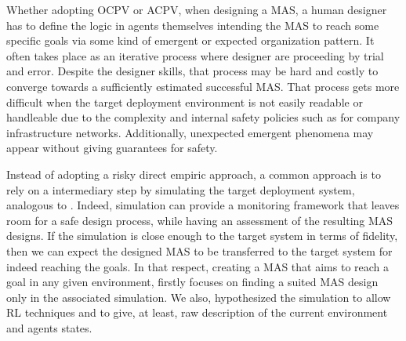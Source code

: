 \documentclass[runningheads]{llncs}
\begin{document}





Whether adopting OCPV or ACPV, when designing a MAS, a human designer has to define the logic in agents themselves intending the MAS to reach some specific goals via some kind of emergent or expected organization pattern. It often takes place as an iterative process where designer are proceeding by trial and error. Despite the designer skills, that process may be hard and costly to converge towards a sufficiently estimated successful MAS. That process gets more difficult when the target deployment environment is not easily readable or handleable due to the complexity and internal safety policies such as for company infrastructure networks. Additionally, unexpected emergent phenomena may appear without giving guarantees for safety.

Instead of adopting a risky direct empiric approach, a common approach is to rely on a intermediary step by simulating the target deployment system, analogous to . Indeed, simulation can provide a monitoring framework that leaves room for a safe design process, while having an assessment of the resulting MAS designs. If the simulation is close enough to the target system in terms of fidelity, then we can expect the designed MAS to be transferred to the target system for indeed reaching the goals.
In that respect, creating a MAS that aims to reach a goal in any given environment, firstly focuses on finding a suited MAS design only in the associated simulation. We also, hypothesized the simulation to allow RL techniques and to give, at least, raw description of the current environment and agents states.
\end{document}

